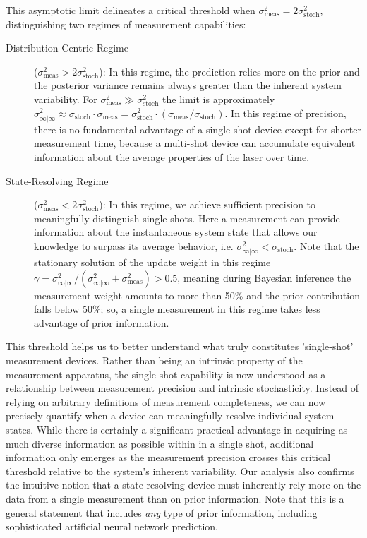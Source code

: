 \documentclass[9pt, twocolumn,superscriptaddress]{revtex4}
\begin{document}
This asymptotic limit delineates a critical threshold when $\sigma^2_{\text{meas}} = 2\sigma^2_{\text{stoch}}$, distinguishing two regimes of measurement capabilities:
\begin{description}
\item[Distribution-Centric Regime] ($\sigma^2_{\text{meas}} > 2\sigma^2_{\text{stoch}}$):
In this regime, the prediction relies more on the prior and the posterior variance remains always greater than the inherent system variability. For $\sigma^2_{\text{meas}} \gg \sigma^2_{\text{stoch}}$ the limit is approximately $\sigma^2_{\infty|\infty}\approx \sigma_{\text{stoch}}\cdot \sigma_{\text{meas}} = \sigma^2_{\text{stoch}}\cdot( \sigma_{\text{meas}}/\sigma_{\text{stoch}})$. In this regime of precision, there is no fundamental advantage of a single-shot device except for shorter measurement time, because a multi-shot device can accumulate equivalent information about the average properties of the laser over time.
\item[State-Resolving Regime] ($\sigma^2_{\text{meas}} < 2\sigma^2_{\text{stoch}}$):
In this regime, we achieve sufficient precision to meaningfully distinguish single shots. Here a measurement can provide information about the instantaneous system state that allows our knowledge to surpass its average behavior, i.e. $\sigma^2_{\infty|\infty}<\sigma_{\text{stoch}}$. Note that the stationary solution of the update weight in this regime $\gamma = \sigma^2_{\infty|\infty}/(\sigma^2_{\infty|\infty} + \sigma^2_{\text{meas}})>0.5$, meaning during Bayesian inference the measurement weight amounts to more than 50\% and the prior contribution falls below 50\%; so, a single measurement in this regime takes less advantage of prior information.
\end{description}
This threshold helps us to better understand what truly constitutes 'single-shot' measurement devices. Rather than being an intrinsic property of the measurement apparatus, the single-shot capability is now understood as a relationship between measurement precision and intrinsic stochasticity. 
Instead of relying on arbitrary definitions of measurement completeness, we can now precisely quantify when a device can meaningfully resolve individual system states. While there is certainly a significant practical advantage in acquiring as much diverse information as possible within in a single shot, additional information only emerges as the measurement precision crosses this critical threshold relative to the system's inherent variability. Our analysis also confirms the intuitive notion that a state-resolving device must inherently rely more on the data from a single measurement than on prior information. Note that this is a general statement that includes \textit{any} type of prior information, including sophisticated artificial neural network prediction.
\end{document}
